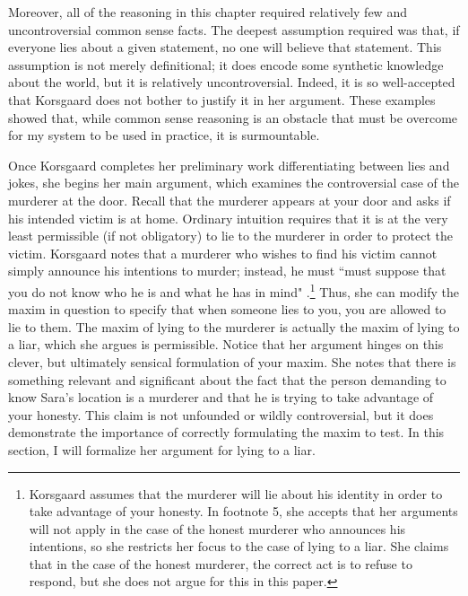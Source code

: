 \begin{isabellebody}
\begin{isamarkuptext}
Moreover, all of the reasoning in this chapter required relatively few and uncontroversial common sense facts. The deepest
assumption required was that, if everyone lies about a given statement, no one will believe that 
statement. This assumption is not merely definitional; it does encode some synthetic knowledge about the 
world, but it is relatively uncontroversial. Indeed, it is so well-accepted that Korsgaard does not 
bother to justify it in her argument. These examples showed that, while common sense reasoning 
is an obstacle that must be overcome for my system to be used in practice, it is surmountable.%
\end{isamarkuptext}\isamarkuptrue%
%
\isadelimdocument
%
\endisadelimdocument
%
\isatagdocument
%
\isamarkuptrue%
%
\endisatagdocument
{\isafolddocument}%
%
\isadelimdocument
%
\endisadelimdocument
%
\begin{isamarkuptext}%
Once Korsgaard completes her preliminary work differentiating between lies and jokes, she begins her main
 argument, which examines the controversial case of the murderer at the door. Recall that the murderer
appears at your door and asks if his intended victim is at home. Ordinary intuition requires that it 
is at the very least permissible (if not obligatory) to lie to the murderer in order to protect the 
victim. Korsgaard notes that a murderer who wishes to find his victim cannot simply announce his
intentions to murder; instead, he must ``must suppose that you do not know who he is and
what he has in mind" \citep[5]{KorsgaardRTL}.\footnote{Korsgaard assumes that the murderer will lie 
about his identity in order to take advantage of your honesty. In footnote 5, she accepts that her 
arguments will not apply in the case of the honest murderer who announces his intentions, so she 
restricts her focus to the case of lying to a liar. She claims that in the case of the honest murderer, the correct act is 
to refuse to respond, but she does not argue for this in this paper.} Thus, she can modify the maxim in 
question to specify that when someone lies to you, you are allowed to lie to them. The maxim of lying 
to the murderer is actually the maxim of lying to a liar, which she argues is permissible. Notice that
her argument hinges on this clever, but ultimately sensical formulation of your maxim. She notes
that there is something relevant and significant about the fact that the person demanding to know Sara's
location is a murderer and that he is trying to take advantage of your honesty. This claim is not
unfounded or wildly controversial, but it does demonstrate the importance of correctly formulating
the maxim to test. In this section, I will formalize her argument for lying to a liar.


\end{isamarkuptext}
\end{isabellebody}
